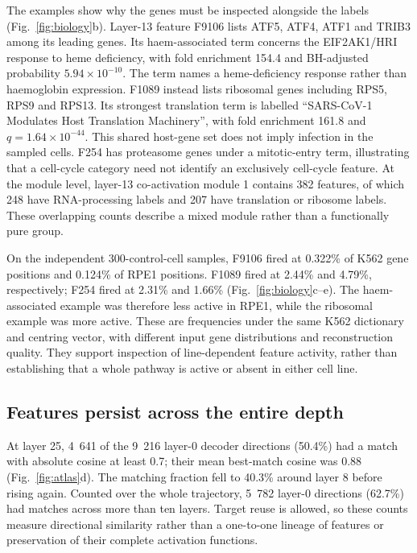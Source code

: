 \documentclass[review,authoryear,12pt]{elsarticle}
\begin{document}
The examples show why the genes must be inspected alongside the labels (Fig.~\ref{fig:biology}b).
Layer-13 feature F9106 lists ATF5, ATF4, ATF1 and TRIB3 among its leading genes. Its haem-associated
term concerns the EIF2AK1/HRI response to heme deficiency, with fold enrichment 154.4 and
BH-adjusted probability $5.94\times10^{-10}$. The term names a heme-deficiency response rather than
haemoglobin expression.
F1089 instead lists ribosomal genes including RPS5, RPS9 and RPS13. Its strongest translation
term is labelled ``SARS-CoV-1 Modulates Host Translation Machinery'', with fold enrichment 161.8
and $q=1.64\times10^{-44}$. This shared host-gene set does not imply infection in the sampled cells.
F254 has proteasome genes under a mitotic-entry term, illustrating that a cell-cycle category
need not identify an exclusively cell-cycle feature. At the module level, layer-13 co-activation
module 1 contains 382 features, of which 248 have RNA-processing labels and 207 have translation
or ribosome labels. These overlapping counts describe a mixed module rather than a functionally
pure group.

On the independent 300-control-cell samples, F9106 fired at 0.322\% of K562 gene positions and
0.124\% of RPE1 positions. F1089 fired at 2.44\% and 4.79\%, respectively; F254 fired at 2.31\%
and 1.66\% (Fig.~\ref{fig:biology}c--e). The haem-associated example was therefore less active
in RPE1, while the ribosomal example was more active. These are frequencies under the same K562
dictionary and centring vector, with different input gene distributions and reconstruction quality.
They support inspection of line-dependent feature activity, rather than establishing that a whole
pathway is active or absent in either cell line.

\subsection{Features persist across the entire depth}
At layer 25, 4~641 of the 9~216 layer-0 decoder directions (50.4\%) had a match with absolute
cosine at least 0.7; their mean best-match cosine was 0.88 (Fig.~\ref{fig:atlas}d).
The matching fraction fell to 40.3\% around layer 8 before rising again. Counted over the whole
trajectory, 5~782 layer-0 directions (62.7\%) had matches across more than ten layers.
Target reuse is allowed, so these counts measure directional similarity rather than a one-to-one
lineage of features or preservation of their complete activation functions.
\end{document}
